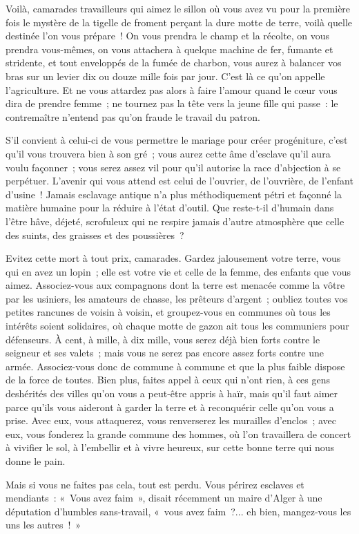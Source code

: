 \documentclass[french,twoside]{book} %
\begin{document}
Voilà, camarades travailleurs qui aimez le sillon où vous avez vu pour la première fois le mystère de la tigelle de froment perçant la dure motte de terre, voilà quelle destinée l’on vous prépare ! On vous prendra le champ et la récolte, on vous prendra vous-mêmes, on vous attachera à quelque machine de fer, fumante et stridente, et tout enveloppés de la fumée de charbon, vous aurez à balancer vos bras sur un levier dix ou douze mille fois par jour. C’est là ce qu’on appelle l’agriculture. Et ne vous attardez pas alors à faire l’amour quand le cœur vous dira de prendre femme ; ne tournez pas la tête vers la jeune fille qui passe : le contremaître n’entend pas qu’on fraude le travail du patron.\par
S’il convient à celui-ci de vous permettre le mariage pour créer progéniture, c’est qu’il vous trouvera bien à son gré ; vous aurez cette âme d’esclave qu’il aura voulu façonner ; vous  serez assez vil pour qu’il autorise la race d’abjection à se perpétuer. L’avenir qui vous attend est celui de l’ouvrier, de l’ouvrière, de l’enfant d’usine ! Jamais esclavage antique n’a plus méthodiquement pétri et façonné la matière humaine pour la réduire à l’état d’outil. Que reste-t-il d’humain dans l’être hâve, déjeté, scrofuleux qui ne respire jamais d’autre atmosphère que celle des suints, des graisses et des poussières ?\par
Evitez cette mort à tout prix, camarades. Gardez jalousement votre terre, vous qui en avez un lopin ; elle est votre vie et celle de la femme, des enfants que vous aimez. Associez-vous aux compagnons dont la terre est menacée comme la vôtre par les usiniers, les amateurs de chasse, les prêteurs d’argent ; oubliez toutes vos petites rancunes de voisin à voisin, et groupez-vous en communes où tous les intérêts soient solidaires, où chaque motte de gazon ait tous les communiers pour défenseurs. À cent, à mille, à dix mille, vous serez déjà bien forts contre le seigneur et ses valets ; mais vous ne serez pas encore assez forts contre une armée. Associez-vous donc de commune à commune et que la plus faible dispose de la force de toutes. Bien plus, faites appel à ceux qui n’ont rien, à ces gens deshérités des villes  qu’on vous a peut-être appris à haïr, mais qu’il faut aimer parce qu’ils vous aideront à garder la terre et à reconquérir celle qu’on vous a prise. Avec eux, vous attaquerez, vous renverserez les murailles d’enclos ; avec eux, vous fonderez la grande commune des hommes, où l’on travaillera de concert à vivifier le sol, à l’embellir et à vivre heureux, sur cette bonne terre qui nous donne le pain.\par
Mais si vous ne faites pas cela, tout est perdu. Vous périrez esclaves et mendiants : « Vous avez faim », disait récemment un maire d’Alger à une députation d’humbles sans-travail, « vous avez faim ?... eh bien, mangez-vous les uns les autres ! »\par
\end{document}
